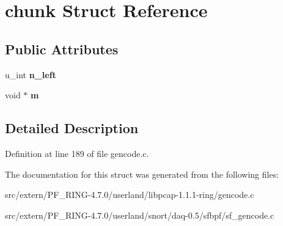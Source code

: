 \hypertarget{structchunk}{
\section{chunk Struct Reference}
\label{structchunk}
}
\subsection*{Public Attributes}
\begin{DoxyCompactItemize}
\item 
\hypertarget{structchunk_ab0430998d9fa580e7789221b65e892a2}{
u\_\-int {\bfseries n\_\-left}}
\label{structchunk_ab0430998d9fa580e7789221b65e892a2}

\item 
\hypertarget{structchunk_a905ceb734c3df7ae0bd07026389a7a2b}{
void $\ast$ {\bfseries m}}
\label{structchunk_a905ceb734c3df7ae0bd07026389a7a2b}

\end{DoxyCompactItemize}


\subsection{Detailed Description}


Definition at line 189 of file gencode.c.



The documentation for this struct was generated from the following files:\begin{DoxyCompactItemize}
\item 
src/extern/PF\_\-RING-\/4.7.0/userland/libpcap-\/1.1.1-\/ring/gencode.c\item 
src/extern/PF\_\-RING-\/4.7.0/userland/snort/daq-\/0.5/sfbpf/sf\_\-gencode.c\end{DoxyCompactItemize}
